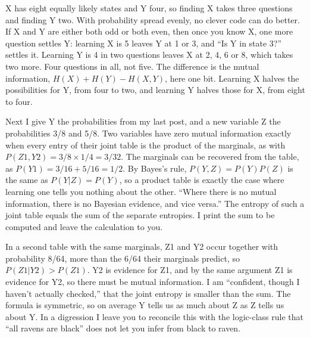 
X has eight equally likely states and Y four, so finding X takes three questions and finding Y two. With probability spread evenly, no clever code can do better. If X and Y are either both odd or both even, then once you know X, one more question settles Y: learning X is 5 leaves Y at 1 or 3, and ``Is Y in state 3?'' settles it. Learning Y is 4 in two questions leaves X at 2, 4, 6 or 8, which takes two more. Four questions in all, not five. The difference is the mutual information, $H(X) + H(Y) - H(X,Y)$, here one bit. Learning X halves the possibilities for Y, from four to two, and learning Y halves those for X, from eight to four. 

Next I give Y the probabilities from my last post, and a new variable Z the probabilities 3/8 and 5/8. Two variables have zero mutual information exactly when every entry of their joint table is the product of the marginals, as with $P(Z1,Y2) = 3/8 \times 1/4 = 3/32$. The marginals can be recovered from the table, as $P(Y1) = 3/16 + 5/16 = 1/2$. By Bayes's rule, $P(Y,Z) = P(Y)P(Z)$ is the same as $P(Y|Z) = P(Y)$, so a product table is exactly the case where learning one tells you nothing about the other. ``Where there is no mutual information, there is no Bayesian evidence, and vice versa.'' The entropy of such a joint table equals the sum of the separate entropies. I print the sum to be computed and leave the calculation to you. 

In a second table with the same marginals, Z1 and Y2 occur together with probability 8/64, more than the 6/64 their marginals predict, so $P(Z1|Y2) > P(Z1)$. Y2 is evidence for Z1, and by the same argument Z1 is evidence for Y2, so there must be mutual information. I am ``confident, though I haven't actually checked,'' that the joint entropy is smaller than the sum. The formula is symmetric, so on average Y tells us as much about Z as Z tells us about Y. In a digression I leave you to reconcile this with the logic-class rule that ``all ravens are black'' does not let you infer from black to raven. 

